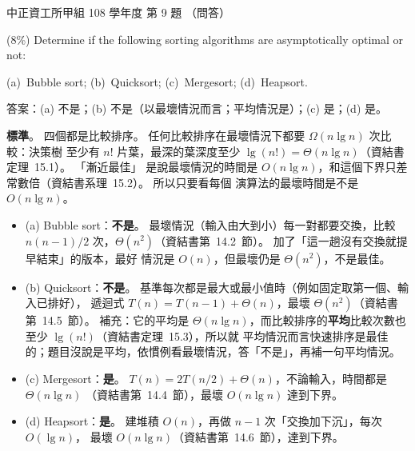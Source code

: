 \begin{pastexam}[label={px:ccu-108-swa-08}]{中正資工所甲組 108 學年度 第 9 題}
（問答）

(8\%) Determine if the following sorting algorithms are asymptotically optimal or not:

(a)~Bubble sort; \qquad (b)~Quicksort; \qquad (c)~Mergesort; \qquad (d)~Heapsort.
\end{pastexam}

\begin{pastsoln}
答案：(a) 不是；(b) 不是（以最壞情況而言；平均情況是）；(c) 是；(d) 是。

\textbf{標準}。 四個都是比較排序。 任何比較排序在最壞情況下都要 $\Omega(n \lg n)$ 次比較：決策樹
至少有 $n!$ 片葉，最深的葉深度至少 $\lg(n!) = \Theta(n \lg n)$（資結書定理~15.1）。 「漸近最佳」
是說最壞情況的時間是 $O(n \lg n)$，和這個下界只差常數倍（資結書系理~15.2）。 所以只要看每個
演算法的最壞時間是不是 $O(n \lg n)$。

\begin{itemize}
\item (a) Bubble sort：\textbf{不是}。 最壞情況（輸入由大到小）每一對都要交換，比較
$n(n-1)/2$ 次，$\Theta(n^2)$（資結書第~14.2~節）。 加了「這一趟沒有交換就提早結束」的版本，最好
情況是 $O(n)$，但最壞仍是 $\Theta(n^2)$，不是最佳。
\item (b) Quicksort：\textbf{不是}。 基準每次都是最大或最小值時（例如固定取第一個、輸入已排好），
遞迴式 $T(n) = T(n-1) + \Theta(n)$，最壞 $\Theta(n^2)$（資結書第~14.5~節）。 補充：它的平均是
$\Theta(n \lg n)$，而比較排序的\textbf{平均}比較次數也至少 $\lg(n!)$（資結書定理~15.3），所以就
平均情況而言快速排序是最佳的；題目沒說是平均，依慣例看最壞情況，答「不是」，再補一句平均情況。
\item (c) Mergesort：\textbf{是}。 $T(n) = 2T(n/2) + \Theta(n)$，不論輸入，時間都是 $\Theta(n \lg n)$
（資結書第~14.4~節），最壞 $O(n \lg n)$ 達到下界。
\item (d) Heapsort：\textbf{是}。 建堆積 $O(n)$，再做 $n - 1$ 次「交換加下沉」，每次 $O(\lg n)$，
最壞 $O(n \lg n)$（資結書第~14.6~節），達到下界。
\end{itemize}
\end{pastsoln}
